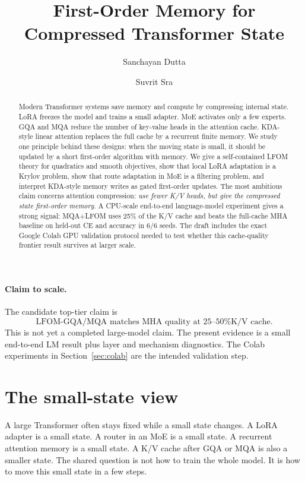 \documentclass[10pt,twocolumn]{article}
\title{First-Order Memory for Compressed Transformer State}
\author{Sanchayan Dutta \and Suvrit Sra}
\date{}
\begin{document}
\maketitle
\begin{abstract}
Modern Transformer systems save memory and compute by compressing internal state. LoRA freezes the model and trains a small adapter. MoE activates only a few experts. GQA and MQA reduce the number of key-value heads in the attention cache. KDA-style linear attention replaces the full cache by a recurrent finite memory. We study one principle behind these designs: when the moving state is small, it should be updated by a short first-order algorithm with memory. We give a self-contained LFOM theory for quadratics and smooth objectives, show that local LoRA adaptation is a Krylov problem, show that route adaptation in MoE is a filtering problem, and interpret KDA-style memory writes as gated first-order updates. The most ambitious claim concerns attention compression: \emph{use fewer K/V heads, but give the compressed state first-order memory}. A CPU-scale end-to-end language-model experiment gives a strong signal: MQA+LFOM uses 25\% of the K/V cache and beats the full-cache MHA baseline on held-out CE and accuracy in 6/6 seeds. The draft includes the exact Google Colab GPU validation protocol needed to test whether this cache-quality frontier result survives at larger scale.
\end{abstract}

\paragraph{Claim to scale.}
The candidate top-tier claim is
\[
\boxed{\text{LFOM-GQA/MQA matches MHA quality at 25--50\% K/V cache.}}
\]
This is not yet a completed large-model claim. The present evidence is a small end-to-end LM result plus layer and mechanism diagnostics. The Colab experiments in Section~\ref{sec:colab} are the intended validation step.

\section{The small-state view}
A large Transformer often stays fixed while a small state changes. A LoRA adapter is a small state. A router in an MoE is a small state. A recurrent attention memory is a small state. A K/V cache after GQA or MQA is also a smaller state. The shared question is not how to train the whole model. It is how to move this small state in a few steps.
\end{document}
